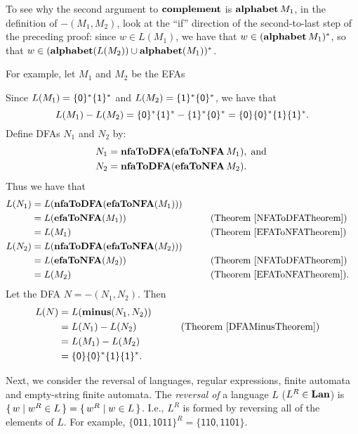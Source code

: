 To see why the second argument to $\mathbf{complement}$ is
$\mathbf{alphabet}\,M_1$, in the definition of $\minus(M_1,M_2)$, look at
the ``if'' direction of the second-to-last step of the preceding
proof: since $w\in L(M_1)$, we have that $w\in(\mathbf{alphabet}\,M_1)^*$, so
that $w\in (\mathbf{alphabet}(L(M_2))\cup\mathbf{alphabet}(M_1))^*$.

For example, let $M_1$ and $M_2$ be the EFAs
\begin{center}

\end{center}
Since $L(M_1)=\{\mathsf{0}\}^*\{\mathsf{1}\}^*$ and
$L(M_2)=\{\mathsf{1}\}^*\{\mathsf{0}\}^*$, we have that
\begin{displaymath}
L(M_1)-L(M_2)=\{\mathsf{0}\}^*\{\mathsf{1}\}^*-\{\mathsf{1}\}^*\{\mathsf{0}\}^* =
\{\mathsf{0}\}\{\mathsf{0}\}^*\{\mathsf{1}\}\{\mathsf{1}\}^* .
\end{displaymath}
Define DFAs $N_1$ and $N_2$ by:
\begin{align*}
N_1 &= \mathbf{nfaToDFA}(\mathbf{efaToNFA}\,M_1) , \;\allowbreak\mbox{and}\allowbreak\; \\
N_2 &= \mathbf{nfaToDFA}(\mathbf{efaToNFA}\,M_2) .
\end{align*}
Thus we have that
\begin{alignat*}{2}
L(N_1) &= L(\mathbf{nfaToDFA}(\mathbf{efaToNFA}(M_1))) \\
       &= L(\mathbf{efaToNFA}(M_1)) && \qquad{\textrm{(Theorem~\ref{NFAToDFATheorem})}} \\
       &= L(M_1) && \qquad{\textrm{(Theorem~\ref{EFAToNFATheorem})}} \\
L(N_2) &= L(\mathbf{nfaToDFA}(\mathbf{efaToNFA}(M_2))) \\
       &= L(\mathbf{efaToNFA}(M_2)) && \qquad{\textrm{(Theorem~\ref{NFAToDFATheorem})}} \\
       &= L(M_2) && \qquad{\textrm{(Theorem~\ref{EFAToNFATheorem})}} .
\end{alignat*}
Let the DFA $N=\minus(N_1,N_2)$.
Then
\begin{alignat*}{2}
L(N) &= L(\mathbf{minus}(N_1,N_2)) \\
     &= L(N_1)-L(N_2) && \qquad{\textrm{(Theorem~\ref{DFAMinusTheorem})}} \\
     &= L(M_1)-L(M_2) \\
     &= \{\mathsf{0}\}\{\mathsf{0}\}^*\{\mathsf{1}\}\{\mathsf{1}\}^* .
\end{alignat*}

Next, we consider the reversal of languages, regular expressions,
finite automata and empty-string finite automata.
The \emph{reversal of}
%
a language $L$ ($L^R\in\mathbf{Lan}$)
%
%
is $\{ \, w \mid w^R\in L \, \} = \{ \, w^R \mid w\in L \, \}$.  I.e., $L^R$ is formed
by reversing all of the elements of $L$.  For example, $\{\mathsf{011,
1011}\}^R = \{\mathsf{110, 1101}\}$.

